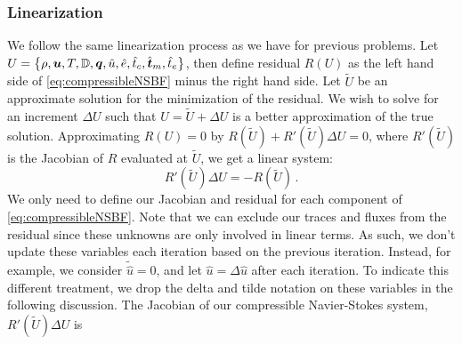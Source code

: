\documentclass[Proposal.tex]{subfiles}
\begin{document}
\subsubsection{Linearization}
We follow the same linearization process as we have for previous problems.
Let $U=\left\{ \rho,\boldsymbol u,T,\mathbb{D},\boldsymbol q,\hat u,\hat e,\hat t_c,\hat{\boldsymbol t}_m,\hat t_e \right\}$, 
then define residual $R(U)$ as the left hand side of \eqref{eq:compressibleNSBF} minus the right hand side.
Let $\tilde U$ be an approximate solution for the minimization of the residual. 
We wish to solve for an increment $\Delta U$ such that $U=\tilde U+\Delta U$ is a better approximation of the true solution.
Approximating $R(U)=0$ by $R(\tilde U)+R'(\tilde U)\Delta U=0$, where $R'(\tilde U)$ is the Jacobian of $R$ evaluated at $\tilde U$, we get a linear system:
\begin{equation}
	R'(\tilde U)\Delta U=-R(\tilde U)\,.
\end{equation}
We only need to define our Jacobian and residual for each component of \eqref{eq:compressibleNSBF}. 
Note that we can exclude our traces and fluxes from the residual since these unknowns are only involved in linear terms.
As such, we don't update these variables each iteration based on the previous iteration.
Instead, for example, we consider $\tilde{\hat u}=0$, and let $\hat u=\Delta\hat u$ after each iteration.
To indicate this different treatment, we drop the delta and tilde notation on these variables in the following discussion.
The Jacobian of our compressible Navier-Stokes system, $R'(\tilde U)\Delta U$ is
\end{document}
